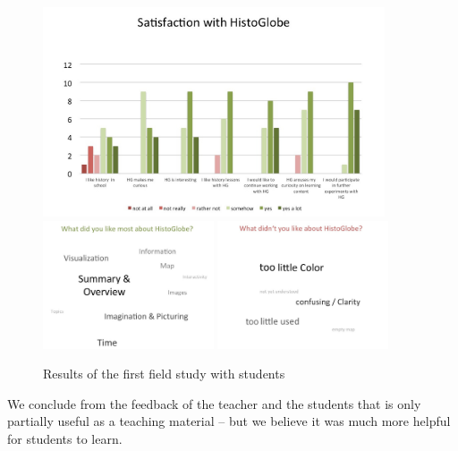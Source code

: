 \begin{figure}[H]
  \begin{center}
    \includegraphics[width=0.9\textwidth]{graphics/test-1-satisfaction.jpg} \\[0.5em]
    \includegraphics[width=0.45\textwidth]{graphics/test-1-tagcloud-pos.jpg}
    \includegraphics[width=0.45\textwidth]{graphics/test-1-tagcloud-neg.jpg}
  \end{center}
  \caption{Results of the first field study with students}
  \label{fig:studyresults-1}
\end{figure}

We conclude from the feedback of the teacher and the students that \HG is only partially useful as a teaching material -- but we believe it was much more helpful for students to learn.


